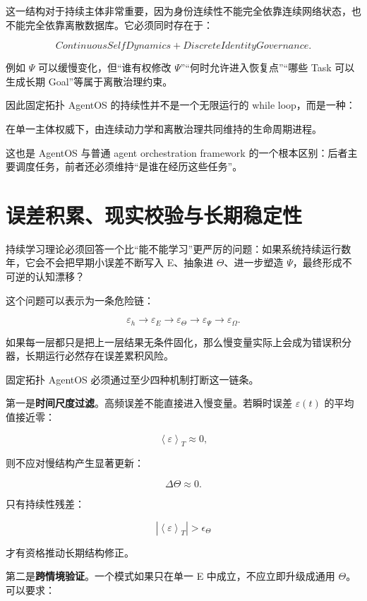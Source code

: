 这一结构对于持续主体非常重要，因为身份连续性不能完全依靠连续网络状态，也不能完全依靠离散数据库。它必须同时存在于：

\[
\boxed{
ContinuousSelfDynamics
+
DiscreteIdentityGovernance.
}
\]

例如 $\Psi$ 可以缓慢变化，但“谁有权修改 $\Psi$”“何时允许进入恢复点”“哪些 Task 可以生成长期 Goal”等属于离散治理约束。

因此固定拓扑 AgentOS 的持续性并不是一个无限运行的 while loop，而是一种：

\begin{statementbox}
在单一主体权威下，由连续动力学和离散治理共同维持的生命周期进程。
\end{statementbox}

这也是 AgentOS 与普通 agent orchestration framework 的一个根本区别：后者主要调度任务，前者还必须维持“是谁在经历这些任务”。

\section{误差积累、现实校验与长期稳定性}

持续学习理论必须回答一个比“能不能学习”更严厉的问题：如果系统持续运行数年，它会不会把早期小误差不断写入 E、抽象进 $\Theta$、进一步塑造 $\Psi$，最终形成不可逆的认知漂移？

这个问题可以表示为一条危险链：

\[
\varepsilon_h
\rightarrow
\varepsilon_E
\rightarrow
\varepsilon_\Theta
\rightarrow
\varepsilon_\Psi
\rightarrow
\varepsilon_\Omega.
\]

如果每一层都只是把上一层结果无条件固化，那么慢变量实际上会成为错误积分器，长期运行必然存在误差累积风险。

固定拓扑 AgentOS 必须通过至少四种机制打断这一链条。

第一是\textbf{时间尺度过滤}。高频误差不能直接进入慢变量。若瞬时误差 $\varepsilon(t)$ 的平均值接近零：

\[
\left\langle
\varepsilon
\right\rangle_T
\approx
0,
\]

则不应对慢结构产生显著更新：

\[
\Delta\Theta
\approx0.
\]

只有持续性残差：

\[
\left|
\left\langle
\varepsilon
\right\rangle_T
\right|
>
\epsilon_\Theta
\]

才有资格推动长期结构修正。

第二是\textbf{跨情境验证}。一个模式如果只在单一 E 中成立，不应立即升级成通用 $\Theta$。可以要求：

